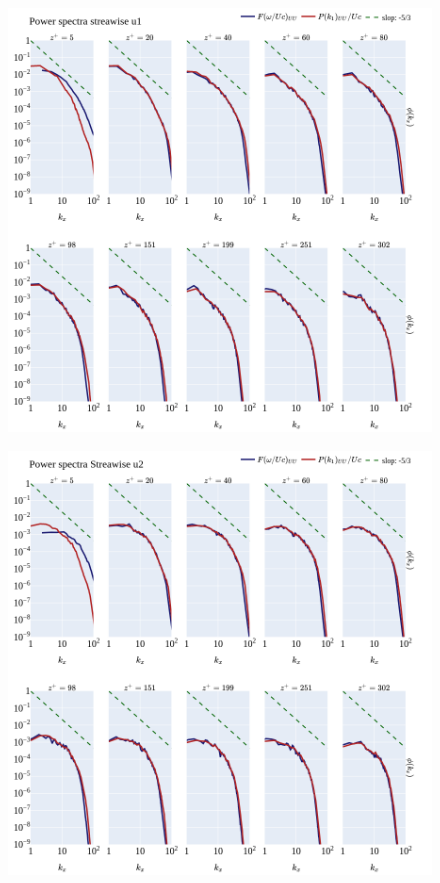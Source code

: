 \documentclass[]{article}
\theoremstyle{plain}
\theoremstyle{remark}
\begin{document}
\begin{figure}[h!]
	\begin{center}
		\includegraphics[width=\textwidth]{../output/split_time/frozen_turbulence/power_spectra/u1_all.png}
	\end{center}
\end{figure}

\begin{figure}[h!]
	\begin{center}
		\includegraphics[width=\textwidth]{../output/split_time/frozen_turbulence/power_spectra/u2_all.png}
	\end{center}
\end{figure}
\end{document}
